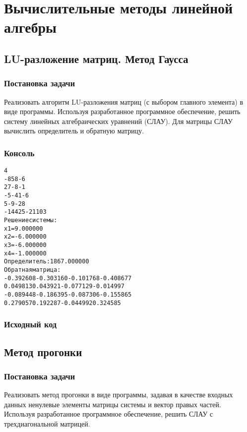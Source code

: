 \section{Вычислительные методы линейной алгебры}

\subsection{LU-разложение матриц. Метод Гаусса}

\subsubsection{Постановка задачи}
Реализовать алгоритм LU-разложения матриц (с выбором главного элемента) в виде программы. Используя разработанное программное обеспечение, решить систему линейных алгебраических уравнений (СЛАУ). Для матрицы СЛАУ вычислить определитель и обратную матрицу.

\subsubsection{Консоль}
\begin{alltt}
4
-8 5 8 -6
2 7 -8 -1
-5 -4  1 -6
5 -9 -2 8
-144 25 -21 103
Решение системы: 
x1=9.000000
x2=-6.000000
x3=-6.000000
x4=-1.000000
Определитель: 1867.000000
Обратная матрица: 
-0.392608 -0.303160 -0.101768 -0.408677 
0.049813 0.043921 -0.077129 -0.014997 
-0.089448 -0.186395 -0.087306 -0.155865 
0.279057 0.192287 -0.044992 0.324585
\end{alltt}
\pagebreak

\subsubsection{Исходный код}

\pagebreak

\subsection{Метод прогонки}

\subsubsection{Постановка задачи}
Реализовать метод прогонки в виде программы, задавая в качестве входных данных ненулевые элементы матрицы системы и вектор правых частей. Используя разработанное программное обеспечение, решить СЛАУ с трехдиагональной матрицей.


